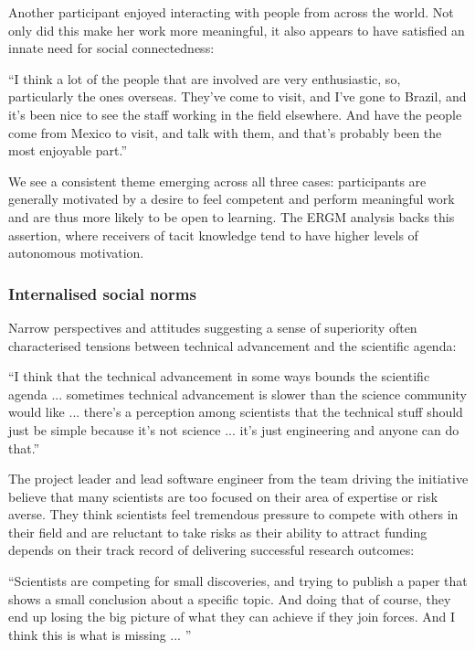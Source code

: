  Another participant enjoyed interacting with people from across the world. Not only did this make her work more meaningful, it also appears to have satisfied an innate need for social connectedness:
 
\begin{displayquote}[Participant 13/3]
\small
\enquote{I think a lot of the people that are involved are very enthusiastic, so, particularly the ones overseas. They've come to visit, and I've gone to Brazil, and it's been nice to see the staff working in the field elsewhere. And have the people come from Mexico to visit, and talk with them, and that's probably been the most enjoyable part.} 
\end{displayquote}

We see a consistent theme emerging across all three cases: participants are generally motivated by a desire to feel competent and perform meaningful work and are thus more likely to be open to learning. The ERGM analysis backs this assertion, where receivers of tacit knowledge tend to have higher levels of autonomous motivation.

\subsubsection{Internalised social norms}

Narrow perspectives and attitudes suggesting a sense of superiority often characterised tensions between technical advancement and the scientific agenda:

\begin{displayquote}[Participant 16/3]
\small
\enquote{I think that the technical advancement in some ways bounds the scientific agenda ... sometimes technical advancement is slower than the science community would like ... there's a perception among scientists that the technical stuff should just be simple because it's not science ... it's just engineering and anyone can do that.} 
\end{displayquote}

The project leader and lead software engineer from the team driving the initiative believe that many scientists are too focused on their area of expertise or risk averse. They think scientists feel tremendous pressure to compete with others in their field and are reluctant to take risks as their ability to attract funding depends on their track record of delivering successful research outcomes:

\begin{displayquote}[Participant 10/3]
\small
\enquote{Scientists are competing for small discoveries, and trying to publish a paper that shows a small conclusion about a specific topic. And doing that of course, they end up losing the big picture of what they can achieve if they join forces. And I think this is what is missing ... } 
\end{displayquote}

